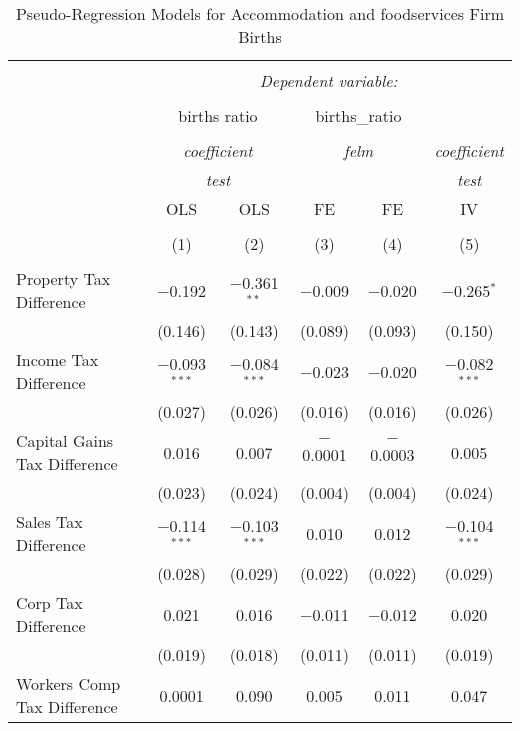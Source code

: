 
\begin{table}[!htbp] \centering 
  \caption{Pseudo-Regression Models for  Accommodation and foodservices Firm Births} 
  \label{} 
\begin{tabular}{@{\extracolsep{5pt}}lccccc} 
\\[-1.8ex]\hline 
\hline \\[-1.8ex] 
 & \multicolumn{5}{c}{\textit{Dependent variable:}} \\ 
\cline{2-6} 
\\[-1.8ex] & \multicolumn{2}{c}{births ratio} & \multicolumn{2}{c}{births\_ratio} &   \\ 
\\[-1.8ex] & \multicolumn{2}{c}{\textit{coefficient}} & \multicolumn{2}{c}{\textit{felm}} & \textit{coefficient} \\ 
 & \multicolumn{2}{c}{\textit{test}} & \multicolumn{2}{c}{\textit{}} & \textit{test} \\ 
 & OLS & OLS & FE & FE & IV \\ 
\\[-1.8ex] & (1) & (2) & (3) & (4) & (5)\\ 
\hline \\[-1.8ex] 
 Property Tax Difference & $-$0.192 & $-$0.361$^{**}$ & $-$0.009 & $-$0.020 & $-$0.265$^{*}$ \\ 
  & (0.146) & (0.143) & (0.089) & (0.093) & (0.150) \\ 
  Income Tax Difference & $-$0.093$^{***}$ & $-$0.084$^{***}$ & $-$0.023 & $-$0.020 & $-$0.082$^{***}$ \\ 
  & (0.027) & (0.026) & (0.016) & (0.016) & (0.026) \\ 
  Capital Gains Tax Difference & 0.016 & 0.007 & $-$0.0001 & $-$0.0003 & 0.005 \\ 
  & (0.023) & (0.024) & (0.004) & (0.004) & (0.024) \\ 
  Sales Tax Difference & $-$0.114$^{***}$ & $-$0.103$^{***}$ & 0.010 & 0.012 & $-$0.104$^{***}$ \\ 
  & (0.028) & (0.029) & (0.022) & (0.022) & (0.029) \\ 
  Corp Tax Difference & 0.021 & 0.016 & $-$0.011 & $-$0.012 & 0.020 \\ 
  & (0.019) & (0.018) & (0.011) & (0.011) & (0.019) \\ 
  Workers Comp Tax Difference & 0.0001 & 0.090 & 0.005 & 0.011 & 0.047 \\ 

\end{tabular}
\end{table}

